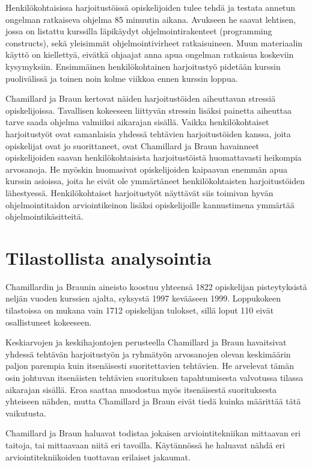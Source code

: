\documentclass[finnish]{../tktltiki2}
\theoremstyle{definition}
\theoremstyle{remark}
\begin{document}
\begin{description}
Henkilökohtaisissa harjoitustöissä opiskelijoiden tulee tehdä ja testata annetun ongelman ratkaiseva ohjelma 85 minuutin aikana. Avukseen he saavat lehtisen, jossa on listattu kurssilla läpikäydyt ohjelmointirakenteet (programming constructs), sekä yleisimmät ohjelmointivirheet ratkaisuineen. Muun materiaalin käyttö on kiellettyä, eivätkä ohjaajat anna apua ongelman ratkaisua koskeviin kysymyksiin. Ensimmäinen henkilökohtainen harjoitustyö pidetään kurssin puolivälissä ja toinen noin kolme viikkoa ennen kurssin loppua.

Chamillard ja Braun kertovat näiden harjoitustöiden aiheuttavan stressiä opiskelijoissa. Tavallisen kokeeseen liittyvän stressin lisäksi painetta aiheuttaa tarve saada ohjelma valmiiksi aikarajan sisällä. Vaikka henkilökohtaiset harjoitustyöt ovat samanlaisia yhdessä tehtävien harjoitustöiden kanssa, joita opiskelijat ovat jo suorittaneet, ovat Chamillard ja Braun havainneet opiskelijoiden saavan henkilökohtaisista harjoitustöistä huomattavasti heikompia arvosanoja. He myöskin huomasivat opiskelijoiden kaipaavan enemmän apua kurssin asioissa, joita he eivät ole ymmärtäneet henkilökohtaisten harjoitustöiden lähestyessä. Henkilökohtaiset harjoitustyöt näyttävät siis toimivan hyvän ohjelmointitaidon arviointikeinon lisäksi opiskelijoille kannustimena ymmärtää ohjelmointikäsitteitä.

\end{description}

\section{Tilastollista analysointia}

Chamillardin ja Braunin aineisto koostuu yhteensä 1822 opiskelijan pisteytyksistä neljän vuoden kurssien ajalta, syksystä 1997 kevääseen 1999. Loppukokeen tilastoissa on mukana vain 1712 opiskelijan tulokset, sillä loput 110 eivät osallistuneet kokeeseen.

Keskiarvojen ja keskihajontojen perusteella Chamillard ja Braun havaitsivat yhdessä tehtävän harjoitustyön ja ryhmätyön arvosanojen olevan keskimäärin paljon parempia kuin itsenäisesti suoritettavien tehtävien. He arvelevat tämän osin johtuvan itsenäisten tehtävien suorituksen tapahtumisesta valvotussa tilassa aikarajan sisällä. Eroa saattaa muodostua myös itsenäisestä suorituksesta yhteiseen nähden, mutta Chamillard ja Braun eivät tiedä kuinka määrittää tätä vaikutusta.

Chamillard ja Braun haluavat todistaa jokaisen arviointitekniikan mittaavan eri taitoja, tai mittaavaan niitä eri tavoilla. Käytännössä he haluavat nähdä eri arviointitekniikoiden tuottavan erilaiset jakaumat.
\end{document}
